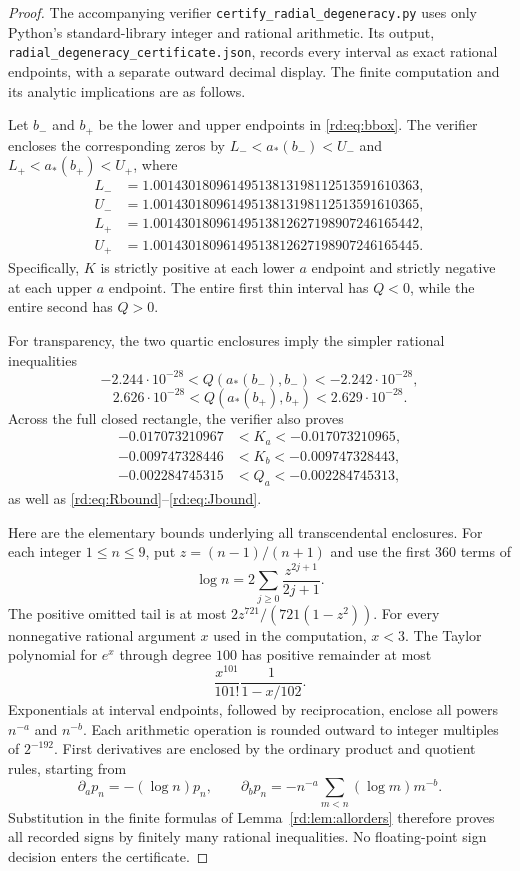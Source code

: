 \begin{proof}
The accompanying verifier \texttt{certify\_radial\_degeneracy.py} uses
only Python's standard-library integer and rational arithmetic. Its
output, \texttt{radial\_degeneracy\_certificate.json}, records every
interval as exact rational endpoints, with a separate outward decimal
display. The finite computation and its analytic implications are as
follows.

Let $b_-$ and $b_+$ be the lower and upper endpoints in
\eqref{rd:eq:bbox}. The verifier encloses the corresponding zeros by
$L_-<a_*(b_-)<U_-$ and $L_+<a_*(b_+)<U_+$, where
\begin{align*}
 L_-&=1.00143018096149513813198112513591610363,\\
 U_-&=1.00143018096149513813198112513591610365,\\
 L_+&=1.00143018096149513812627198907246165442,\\
 U_+&=1.00143018096149513812627198907246165445.
\end{align*}
Specifically, $K$ is strictly positive at each lower $a$ endpoint and
strictly negative at each upper $a$ endpoint. The entire first thin
interval has $Q<0$, while the entire second has $Q>0$.

For transparency, the two quartic enclosures imply the simpler rational
inequalities
\[
 -2.244\cdot10^{-28}<Q(a_*(b_-),b_-)<-2.242\cdot10^{-28},
\]
\[
 2.626\cdot10^{-28}<Q(a_*(b_+),b_+)<2.629\cdot10^{-28}.
\]
Across the full closed rectangle, the verifier also proves
\begin{align*}
 -0.017073210967&<K_a<-0.017073210965,\\
 -0.009747328446&<K_b<-0.009747328443,\\
 -0.002284745315&<Q_a<-0.002284745313,
\end{align*}
as well as \eqref{rd:eq:Rbound}--\eqref{rd:eq:Jbound}.

Here are the elementary bounds underlying all transcendental
enclosures. For each integer $1\le n\le9$, put
$z=(n-1)/(n+1)$ and use the first $360$ terms of
\[
 \log n=2\sum_{j\ge0}\frac{z^{2j+1}}{2j+1}.
\]
The positive omitted tail is at most
$2z^{721}/(721(1-z^2))$. For every nonnegative rational argument
$x$ used in the computation, $x<3$. The Taylor polynomial for $e^x$
through degree $100$ has positive remainder at most
\[
 \frac{x^{101}}{101!}\frac{1}{1-x/102}.
\]
Exponentials at interval endpoints, followed by reciprocation, enclose
all powers $n^{-a}$ and $n^{-b}$. Each arithmetic operation is rounded
outward to integer multiples of $2^{-192}$. First derivatives are
enclosed by the ordinary product and quotient rules, starting from
\[
 \partial_a p_n=-(\log n)p_n,\qquad
 \partial_b p_n=-n^{-a}\sum_{m<n}(\log m)m^{-b}.
\]
Substitution in the finite formulas of Lemma~\ref{rd:lem:allorders}
therefore proves all recorded signs by finitely many rational
inequalities. No floating-point sign decision enters the certificate.


\end{proof}
